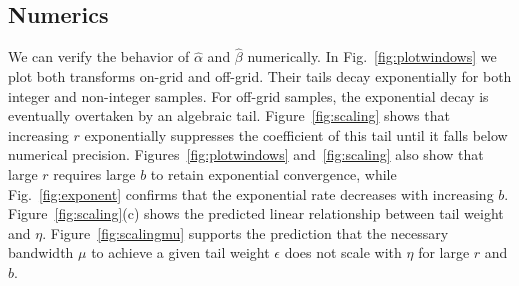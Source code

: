 \subsection{Numerics}
We can verify the behavior of $\hat \alpha$ and $\hat \beta$ numerically. In Fig.~\ref{fig:plotwindows} we plot both transforms on-grid and off-grid. Their tails decay exponentially for both integer and non-integer samples. For off-grid samples, the exponential decay is eventually overtaken by an algebraic tail. Figure~\ref{fig:scaling} shows that increasing $r$ exponentially suppresses the coefficient of this tail until it falls below numerical precision. Figures~\ref{fig:plotwindows} and~\ref{fig:scaling} also show that large $r$ requires large $b$ to retain exponential convergence, while Fig.~\ref{fig:exponent} confirms that the exponential rate decreases with increasing $b$. Figure~\ref{fig:scaling}(c) shows the predicted linear relationship between tail weight and $\eta$. Figure~\ref{fig:scalingmu} supports the prediction that the necessary bandwidth $\mu$ to achieve a given tail weight $\epsilon$ does not scale with $\eta$ for large $r$ and $b$. 

